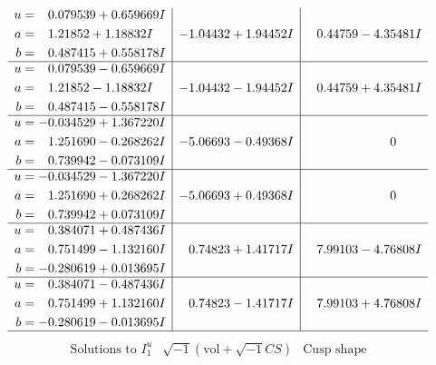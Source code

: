 \documentclass[1p]{elsarticle_modified}
\theoremstyle{definition}
\newcommand{\I}{\sqrt{-1}}
\begin{document}
$$\begin{array}{c|c|c}
\begin{aligned}
u &= \phantom{-}0.079539 + 0.659669 I \\
a &= \phantom{-}1.21852 + 1.18832 I \\
b &= \phantom{-}0.487415 + 0.558178 I\end{aligned}
 & -1.04432 + 1.94452 I & \phantom{-}0.44759 - 4.35481 I \\ \hline\begin{aligned}
u &= \phantom{-}0.079539 - 0.659669 I \\
a &= \phantom{-}1.21852 - 1.18832 I \\
b &= \phantom{-}0.487415 - 0.558178 I\end{aligned}
 & -1.04432 - 1.94452 I & \phantom{-}0.44759 + 4.35481 I \\ \hline\begin{aligned}
u &= -0.034529 + 1.367220 I \\
a &= \phantom{-}1.251690 - 0.268262 I \\
b &= \phantom{-}0.739942 - 0.073109 I\end{aligned}
 & -5.06693 - 0.49368 I & \phantom{-0.000000 } 0 \\ \hline\begin{aligned}
u &= -0.034529 - 1.367220 I \\
a &= \phantom{-}1.251690 + 0.268262 I \\
b &= \phantom{-}0.739942 + 0.073109 I\end{aligned}
 & -5.06693 + 0.49368 I & \phantom{-0.000000 } 0 \\ \hline\begin{aligned}
u &= \phantom{-}0.384071 + 0.487436 I \\
a &= \phantom{-}0.751499 - 1.132160 I \\
b &= -0.280619 + 0.013695 I\end{aligned}
 & \phantom{-}0.74823 + 1.41717 I & \phantom{-}7.99103 - 4.76808 I \\ \hline\begin{aligned}
u &= \phantom{-}0.384071 - 0.487436 I \\
a &= \phantom{-}0.751499 + 1.132160 I \\
b &= -0.280619 - 0.013695 I\end{aligned}
 & \phantom{-}0.74823 - 1.41717 I & \phantom{-}7.99103 + 4.76808 I\\
 \hline 
 \end{array}$$\newpage$$\begin{array}{c|c|c}  
\text{Solutions to }I^u_{1}& \I (\text{vol} + \sqrt{-1}CS) & \text{Cusp shape}\\

\end{array}$$
\end{document}
